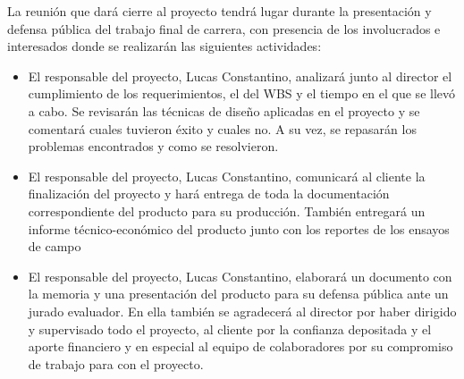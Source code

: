 \documentclass[
11pt, %
codirector, %
]{charter}
\begin{document}
La reunión que dará cierre al proyecto tendrá lugar durante la presentación y defensa pública del trabajo final de carrera, con presencia de los involucrados e interesados donde se realizarán las siguientes actividades:

\begin{itemize}
	\item El responsable del proyecto, Lucas Constantino, analizará junto al director el cumplimiento de los requerimientos, el del WBS y el tiempo en el que se llevó a cabo. Se revisarán las técnicas de diseño aplicadas en el proyecto y se comentará cuales tuvieron éxito y cuales no. A su vez, se repasarán los problemas encontrados y como se resolvieron.
	\item El responsable del proyecto, Lucas Constantino, comunicará al cliente la finalización del proyecto y hará entrega de toda la documentación correspondiente del producto para su producción. También entregará un informe técnico-económico del producto junto con los reportes de los ensayos de campo
	\item El responsable del proyecto, Lucas Constantino, elaborará un documento con la memoria y una presentación del producto para su defensa pública ante un jurado evaluador. En ella también se agradecerá al director por haber dirigido y supervisado todo el proyecto, al cliente por la confianza depositada y el aporte financiero y en especial al equipo de colaboradores por su compromiso de trabajo para con el proyecto.
\end{itemize}
\end{document}
